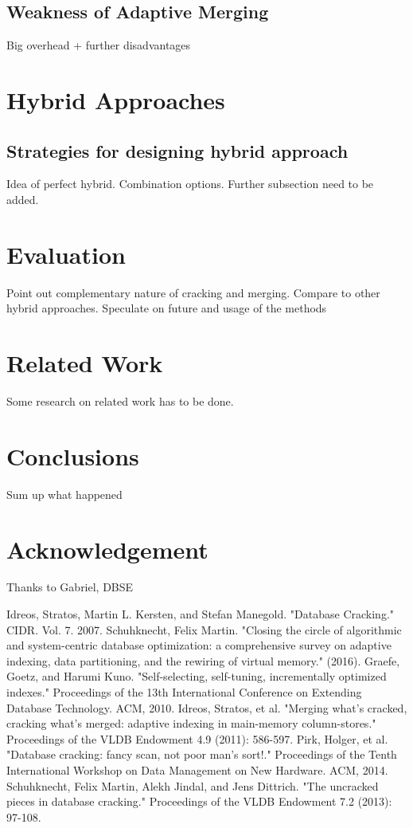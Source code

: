 \documentclass[10pt, conference, compsocconf]{IEEEtran}
\begin{document}
\subsection{Weakness of Adaptive Merging}
Big overhead + further disadvantages

\section{Hybrid Approaches}
\subsection{Strategies for designing hybrid approach}
Idea of perfect hybrid. Combination options. Further subsection need to be added.

\section{Evaluation}
Point out complementary nature of cracking and merging. Compare to other hybrid approaches. Speculate on future and usage of the methods

\section{Related Work}
Some research on related work has to be done.

\section{Conclusions}
Sum up what happened

\section*{Acknowledgement}
Thanks to Gabriel, DBSE

\begin{thebibliography}{1}

Idreos, Stratos, Martin L. Kersten, and Stefan Manegold. "Database Cracking." CIDR. Vol. 7. 2007.
Schuhknecht, Felix Martin. "Closing the circle of algorithmic and system-centric database optimization: a comprehensive survey on adaptive indexing, data partitioning, and the rewiring of virtual memory." (2016).
Graefe, Goetz, and Harumi Kuno. "Self-selecting, self-tuning, incrementally optimized indexes." Proceedings of the 13th International Conference on Extending Database Technology. ACM, 2010.
Idreos, Stratos, et al. "Merging what's cracked, cracking what's merged: adaptive indexing in main-memory column-stores." Proceedings of the VLDB Endowment 4.9 (2011): 586-597.
Pirk, Holger, et al. "Database cracking: fancy scan, not poor man's sort!." Proceedings of the Tenth International Workshop on Data Management on New Hardware. ACM, 2014.
Schuhknecht, Felix Martin, Alekh Jindal, and Jens Dittrich. "The uncracked pieces in database cracking." Proceedings of the VLDB Endowment 7.2 (2013): 97-108.

\end{thebibliography}
\end{document}
